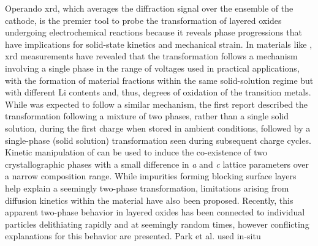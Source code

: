 \documentclass{WileyMSP-template}
\begin{document}



Operando \gls{xrd}, which averages the diffraction signal over the
ensemble of the cathode, is the premier tool to probe the
transformation of layered oxides undergoing electrochemical reactions
because it reveals phase progressions that have implications for
solid-state kinetics and mechanical strain.  In \nmc{} materials like
\nmc[333]{}, \gls{xrd} measurements have revealed that the
transformation follows a mechanism involving a single phase in the
range of voltages used in practical
applications\cite{hulzen2018,ahn2017,zhou2016-2}, with the formation
of material fractions within the same solid-solution regime but with
different Li contents and, thus, degrees of oxidation of the
transition metals. While \nca{} was expected to follow a similar
mechanism, the first report described the transformation following a
mixture of two phases, rather than a single solid solution, during the
first charge when stored in ambient conditions, followed by a
single-phase (solid solution) transformation seen during subsequent
charge cycles\cite{robert2015}. Kinetic manipulation of \nmc[333]{}
can be used to induce the co-existence of two crystallographic phases
with a small difference in \emph{a} and \emph{c} lattice parameters
over a narrow composition range\cite{yoon2006,hua2018}. While
impurities forming blocking surface layers help explain a seemingly
two-phase transformation\cite{grenier2017}, limitations arising from
diffusion kinetics within the material have also been
proposed\cite{chapman2020}. Recently, this apparent two-phase behavior
in layered oxides has been connected to individual particles
delithiating rapidly and at seemingly random times\cite{chueh2021,
  zhao2022, rao2021, wang2020-6}, however conflicting explanations for
this behavior are presented. Park et al. \cite{chueh2021} used in-situ
\end{document}
